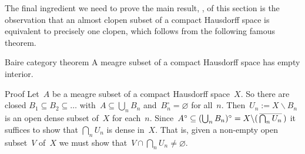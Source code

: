 \documentclass[a]{subfiles}
\begin{document}
\begin{parsec}%
\begin{point}%
The final ingredient
we need to prove the main result, ,
of this section
is the observation
that an almost clopen subset of a compact Hausdorff space
is equivalent to precisely one clopen,
which follows from the following famous theorem.
\end{point}
\begin{point}{Baire category theorem}%
A meagre subset of a compact Hausdorff space
has empty interior.
\begin{point}{Proof}%
Let~$A$ be a meagre subset of a compact Hausdorff space~$X$.
So there are closed $B_1\subseteq B_2\subseteq \dotsc$
with~$A\subseteq \bigcup_n B_n$
and~$B_n^\circ=\varnothing$ for all~$n$.
Then~$U_n:= X\backslash B_n$
is an open dense subset of~$X$
for each~$n$.
Since~$A^\circ \subseteq (\bigcup_n B_n)^\circ  =
X\backslash (\,\smash{\overline{\bigcap_n U_n}}\,)$
it suffices to show that
$\bigcap_n U_n$ is dense in~$X$.
That is, given a non-empty open subset~$V$
of~$X$ we must show that~$V\cap\bigcap_n U_n\neq \varnothing$.


\end{point}
\end{point}
\end{parsec}
\end{document}
